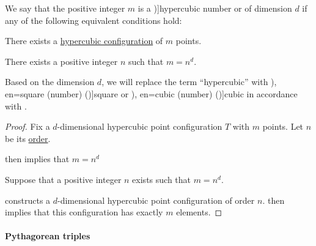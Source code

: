 \begin{definition}\label{def:hypercubic_number}
  We say that the positive integer \( m \) is a \term[en=hypercube number (\cite[\S 3.2.4]{Deza2012FigurateNumbers})]{hypercubic number} or  of dimension \( d \) if any of the following equivalent conditions hold:
  \begin{thmenum}
    \mimprovised There exists a \hyperref[def:hypercubic_point_configuration]{hypercubic configuration} of \( m \) points.

     There exists a positive integer \( n \) such that \( m = n^d \).
  \end{thmenum}

  Based on the dimension \( d \), we will replace the term \enquote{hypercubic} with \term[ru=квадратное (число) (\cite[14]{АлександровМаркушевичХинчинИПр1963ЭнциклопедияТом4}), en=square (number) (\cite[1]{Deza2012FigurateNumbers})]{square} or \term[ru=кубическое (число) (\cite[14]{АлександровМаркушевичХинчинИПр1963ЭнциклопедияТом4}), en=cubic (number) (\cite[1]{Deza2012FigurateNumbers})]{cubic} in accordance with .
\end{definition}
\begin{proof}
   Fix a \( d \)-dimensional hypercubic point configuration \( T \) with \( m \) points. Let \( n \) be its \hyperref[def:hypercubic_point_configuration_order]{order}.

   then implies that \( m = n^d \)

   Suppose that a positive integer \( n \) exists such that \( m = n^d \).

   constructs a \( d \)-dimensional hypercubic point configuration of order \( n \).  then implies that this configuration has exactly \( m \) elements.
\end{proof}

\paragraph{Pythagorean triples}

